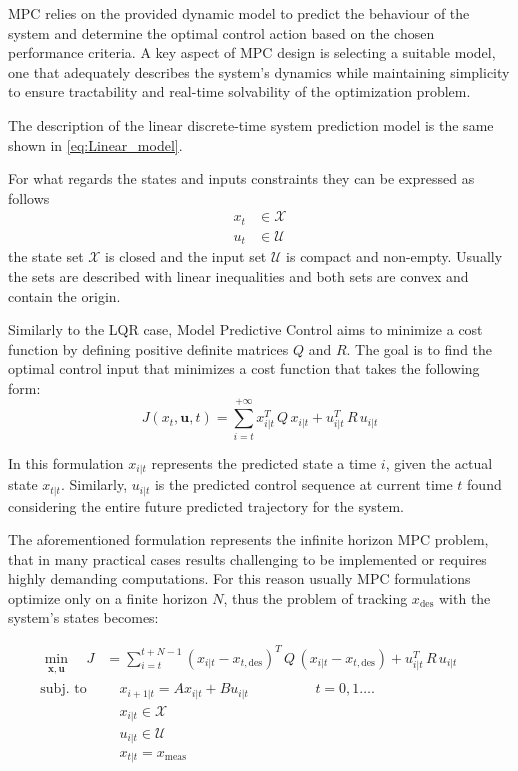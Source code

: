 \documentclass[a4paper,12pt,oneside]{book}
\begin{document}
\bigskip
MPC relies on the provided dynamic model to predict the behaviour of the system and determine the optimal control action based on the chosen performance criteria. 
A key aspect of MPC design is selecting a suitable model, one that adequately describes the system's dynamics while maintaining simplicity to ensure tractability and real-time solvability of the optimization problem.

\bigskip
The description of the linear discrete-time system prediction model is the same shown in \ref{eq:Linear_model}.

For what regards the states and inputs constraints they can be expressed as follows
\begin{align}
    x_t & \in \mathcal{X} \\
    u_t & \in \mathcal{U}
\end{align}
the state set $\mathcal{X}$ is closed and the input set $\mathcal{U}$ is compact and non-empty. Usually the sets are described with linear inequalities and both sets are convex and contain the origin.

\bigskip
Similarly to the LQR case, Model Predictive Control aims to minimize a cost function by defining positive definite matrices $Q$ and $R$. The goal is to find the optimal control input that minimizes a cost function that takes the following form:
\begin{equation}
    J(x_t, \boldsymbol{u}, t) = \sum_{i=t} ^{+ \infty} x_{i|t}^T \, Q \, x_{i|t} + u_{i|t}^T \, R \, u_{i|t}
\end{equation}

In this formulation $x_{i|t}$ represents the predicted state a time $i$, given the actual state $x_{t|t}$. 
Similarly, $u_{i|t}$ is the predicted control sequence at current time $t$ found considering the entire future predicted trajectory for the system.

The aforementioned formulation represents the infinite horizon MPC problem, that in many practical cases results challenging to be implemented or requires highly demanding computations.
For this reason usually MPC formulations optimize only on a finite horizon $N$, thus the problem of tracking $x_{\text{des}}$ with the system's states becomes:

\begin{equation}
\begin{alignedat}{2}
	\min_{\substack{\boldsymbol{x}, \boldsymbol{u}}}\quad J &= \sum_{i=t}^{t+N-1} (x_{i|t} - x_{t,\text{des}}) ^T \, Q \, (x_{i|t} - x_{t,\text{des}}) +  u_{i|t}^T \, R \, u_{i|t} &&   \\
	\text{subj. to} & \quad x_{i+1|t}  = A x_{i|t} + B u_{i|t}   \hspace{2cm} t = 0, 1 \ldots. &&  \\
     &\quad x_{i|t} \in \mathcal{X} && \\
    &\quad u_{i|t} \in \mathcal{U} && \\
    &\quad x_{t|t} = x_{\text{meas}} && 
\end{alignedat}
\label{MPC1}
\end{equation}
\end{document}
